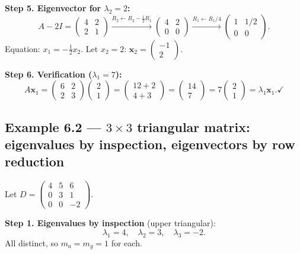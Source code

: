 \documentclass[12pt,a4paper]{article}
\begin{document}
\textbf{Step 5. Eigenvector for $\lambda_2 = 2$:}
\[
  A - 2I = \begin{pmatrix} 4 & 2 \\ 2 & 1 \end{pmatrix}
  \xrightarrow{R_2 \leftarrow R_2 - \frac{1}{2}R_1}
  \begin{pmatrix} 4 & 2 \\ 0 & 0 \end{pmatrix}
  \xrightarrow{R_1 \leftarrow R_1/4}
  \begin{pmatrix} 1 & 1/2 \\ 0 & 0 \end{pmatrix}.
\]
Equation: $x_1 = -\tfrac{1}{2}x_2$. Let $x_2 = 2$: $\mathbf{x}_2 = \begin{pmatrix}-1\\2\end{pmatrix}$.

\textbf{Step 6. Verification ($\lambda_1 = 7$):}
\[
  A\mathbf{x}_1 = \begin{pmatrix}6&2\\2&3\end{pmatrix}\begin{pmatrix}2\\1\end{pmatrix}
  = \begin{pmatrix}12+2\\4+3\end{pmatrix} = \begin{pmatrix}14\\7\end{pmatrix}
  = 7\begin{pmatrix}2\\1\end{pmatrix} = \lambda_1\mathbf{x}_1. \checkmark
\]

\subsection*{Example 6.2 --- $3\times 3$ triangular matrix: eigenvalues by inspection, eigenvectors by row reduction}

Let $D = \begin{pmatrix} 4 & 5 & 6 \\ 0 & 3 & 1 \\ 0 & 0 & -2 \end{pmatrix}$.

\textbf{Step 1. Eigenvalues by inspection} (upper triangular):
\[
  \lambda_1 = 4,\quad \lambda_2 = 3,\quad \lambda_3 = -2.
\]
All distinct, so $m_a = m_g = 1$ for each.
\end{document}
